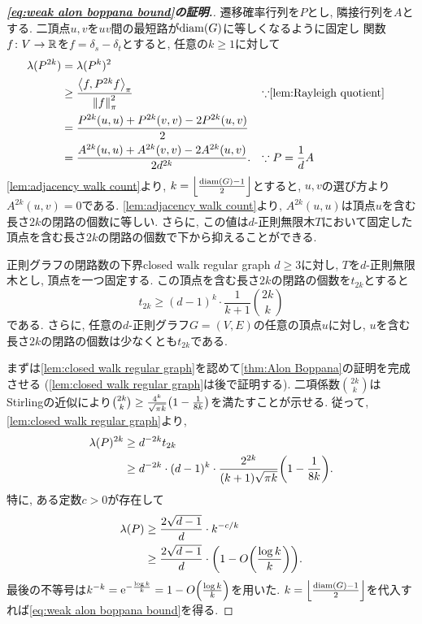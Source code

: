 \begin{proof}[\textbf{\cref{eq:weak alon boppana bound}の証明.}]
    遷移確率行列を$P$とし, 隣接行列を$A$とする.
    二頂点$u,v$を$uv$間の最短路が$\diam(G)$に等しくなるように固定し
    関数$f \colon V \to \Real$を$f = \delta_s - \delta_t$とすると, 任意の$k\ge 1$に対して
    \begin{align*}
        \lambda(P^{2k}) & = \lambda(P^k)^2                                                                                                \\
                        & \ge \frac{\piprod{f,P^{2k} f}}{\pinorm{f}^2}                  &  & \text{$\because$\cref{lem:Rayleigh quotient}} \\
                        & = \frac{P^{2k}(u,u) + P^{2k}(v,v) - 2P^{2k}(u,v)}{2}                                                            \\
                        & = \frac{A^{2k}(u,u) + A^{2k}(v,v) - 2A^{2k}(u,v)}{2d^{2k}}. &  & \text{$\because P=\frac{1}{d}A$}
    \end{align*}
    \cref{lem:adjacency walk count}より, $k=\floor*{\frac{\diam(G)-1}{2}}$とすると, $u,v$の選び方より$A^{2k}(u,v)=0$である.
    \cref{lem:adjacency walk count}より, $A^{2k}(u,u)$は頂点$u$を含む長さ$2k$の閉路の個数に等しい.
    さらに, この値は$d$-正則無限木$T$において固定した頂点を含む長さ$2k$の閉路の個数で下から抑えることができる.

    \begin{lemma}{正則グラフの閉路数の下界}{closed walk regular graph}
        $d\ge 3$に対し, $T$を$d$-正則無限木とし, 頂点を一つ固定する.
        この頂点を含む長さ$2k$の閉路の個数を$t_{2k}$とすると
        \[ t_{2k} \ge (d-1)^{k}\cdot \frac{1}{k+1}\binom{2k}{k} \]
        である.
        さらに,
        任意の$d$-正則グラフ$G=(V,E)$の任意の頂点$u$に対し, $u$を含む長さ$2k$の閉路の個数は少なくとも$t_{2k}$である.
    \end{lemma}

    まずは\cref{lem:closed walk regular graph}を認めて\cref{thm:Alon Boppana}の証明を完成させる (\cref{lem:closed walk regular graph}は後で証明する).
    二項係数$\binom{2k}{k}$はStirlingの近似により$\binom{2k}{k} \ge \frac{4^k}{\sqrt{\pi k}}\rbra*{1-\frac{1}{8k}}$を満たすことが示せる.
    従って, \cref{lem:closed walk regular graph}より,
    \begin{align*}
        \lambda(P)^{2k} & \ge d^{-2k} t_{2k}                                                                     \\
                        & \ge d^{-2k}\cdot (d-1)^k \cdot \frac{2^{2k}}{(k+1)\sqrt{\pi k}}\rbra*{1-\frac{1}{8k}}.
    \end{align*}
    特に, ある定数$c>0$が存在して
    \begin{align*}
        \lambda(P) & \ge \frac{2\sqrt{d-1}}{d} \cdot k^{-c/k}                            \\
                   & \ge \frac{2\sqrt{d-1}}{d}\cdot \rbra*{1-O\rbra*{\frac{\log k}{k}}}.
    \end{align*}
    最後の不等号は$k^{-k}=\e^{-\frac{\log k}{k}} = 1-O\rbra*{\frac{\log k}{k}}$を用いた.
    $k=\floor*{\frac{\diam(G)-1}{2}}$を代入すれば\cref{eq:weak alon boppana bound}を得る.
\end{proof}
